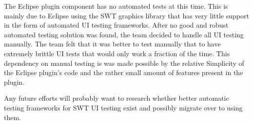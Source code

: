 \documentclass[12pt,a4paper,english,leqno]{article}
\begin{document}
The Eclipse plugin component has no automated tests at this time.
This is mainly due to Eclipse using the SWT graphics library that has very little support in the form of automated UI testing frameworks.
After no good and robust automated testing solution was found, the team decided to handle all UI testing manually.
The team felt that it was better to test manually that to have extremely brittle UI tests that would only work a fraction of the time.
This dependency on manual testing is was made possible by the relative Simplicity of the Eclipse plugin's code and the rather small amount of features present in the plugin.

Any future efforts will probably want to research whether better automatic testing frameworks for SWT UI testing exist and possibly migrate over to using them.
\end{document}

